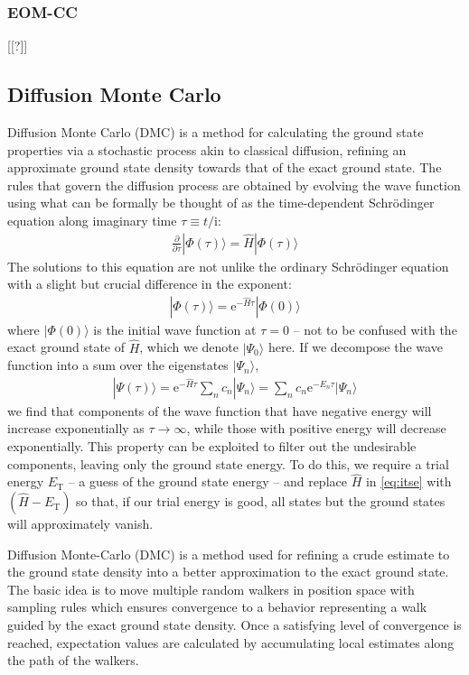 \subsubsection{EOM-CC}

[[?]]

\subsection{Diffusion Monte Carlo}
\label{subsec:DMC}

Diffusion Monte Carlo (DMC) is a method for calculating the ground state properties via a stochastic process akin to classical diffusion, refining an approximate ground state density towards that of the exact ground state.  The rules that govern the diffusion process are obtained by evolving the wave function using what can be formally be thought of as the time-dependent Schr\"odinger equation along imaginary time $\tau \equiv t / \mathrm{i}$:
\begin{align} \label{eq:itse}
  \frac{\partial}{\partial \tau} |\Phi(\tau)\rangle = \hat H |\Phi(\tau)\rangle
\end{align}
The solutions to this equation are not unlike the ordinary Schr\"odinger equation with a slight but crucial difference in the exponent:
\begin{align*}
  |\Phi(\tau)\rangle = \mathrm e^{-\hat H \tau} |\Phi(0)\rangle
\end{align*}
where $|\Phi(0)\rangle$ is the initial wave function at $\tau = 0$ -- not to be confused with the exact ground state of $\hat H$, which we denote $|\Psi_0\rangle$ here.  If we decompose the wave function into a sum over the eigenstates $|\Psi_n\rangle$,
\begin{align*}
  |\Psi(\tau)\rangle
  = \mathrm e^{-\hat H \tau} \sum_n c_n |\Psi_n\rangle
  = \sum_n c_n \mathrm e^{-E_n \tau} |\Psi_n\rangle
\end{align*}
we find that components of the wave function that have negative energy will increase exponentially as $\tau \to \infty$, while those with positive energy will decrease exponentially.  This property can be exploited to filter out the undesirable components, leaving only the ground state energy.  To do this, we require a trial energy $E_{\text{T}}$ -- a guess of the ground state energy -- and replace $\hat H$ in \eqref{eq:itse} with $(\hat H - E_{\text{T}})$ so that, if our trial energy is good, all states but the ground states will approximately vanish.

Diffusion Monte-Carlo (DMC) is a method used for refining a crude estimate to the ground state density into a better approximation to the exact ground state. The basic idea is to move multiple random walkers in position space with sampling rules which ensures convergence to a behavior representing a walk guided by the exact ground state density. Once a satisfying level of convergence is reached, expectation values are calculated by accumulating local estimates along the path of the walkers.

